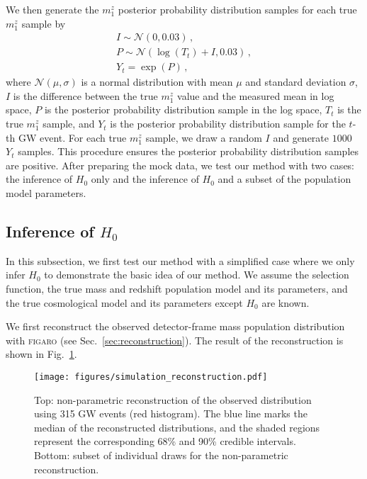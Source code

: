 \documentclass[sn-aps, pdflatex, iicol]{sn-jnl}
\begin{document}
We then generate the $m^z_1$ posterior probability distribution samples for each true $m^z_1$ sample by
\begin{gather*}
    I \sim \mathcal{N}(0, 0.03)\,,\\
    P \sim \mathcal{N}(\log(T_t)+I, 0.03)\,,\\
    Y_t = \exp(P)\,,
\end{gather*}
where $\mathcal{N}(\mu, \sigma)$ is a normal distribution with mean $\mu$ and standard deviation $\sigma$, $I$ is the difference between the true $m^z_1$ value and the measured mean in log space, $P$ is the posterior probability distribution sample in the log space, $T_t$ is the true $m^z_1$ sample, and $Y_t$ is the posterior probability distribution sample for the $t$-th \ac{GW} event.
For each true $m^z_1$ sample, we draw a random $I$ and generate $1000$ $Y_t$ samples.
This procedure ensures the posterior probability distribution samples are positive.
After preparing the mock data, we test our method with two cases: the inference of $H_0$ only and the inference of $H_0$ and a subset of the population model parameters.

\subsection{Inference of $H_0$}
\label{sec:inference_H0}

In this subsection, we first test our method with a simplified case where we only infer $H_0$ to demonstrate the basic idea of our method.
We assume the selection function, the true mass and redshift population model and its parameters, and the true cosmological model and its parameters except $H_0$ are known.

We first reconstruct the observed detector-frame mass population distribution with \textsc{figaro} (see Sec.~\ref{sec:reconstruction}).
The result of the reconstruction is shown in Fig.~\ref{fig:simulation_reconstruction}.
\begin{figure}
    \texttt{[image: figures/simulation\_reconstruction.pdf]}
    \caption{
        Top: non-parametric reconstruction of the observed distribution using 315 GW events (red histogram).
        The blue line marks the median of the reconstructed distributions, and the shaded regions represent the corresponding 68\% and 90\% credible intervals.
        Bottom: subset of individual draws for the non-parametric reconstruction.
    }
    \label{fig:simulation_reconstruction}
\end{figure}
\end{document}
